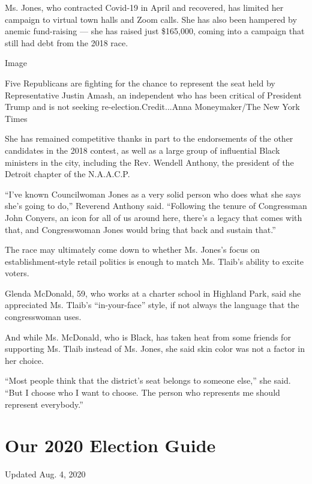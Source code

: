 Ms. Jones, who contracted Covid-19 in April and recovered, has limited
her campaign to virtual town halls and Zoom calls. She has also been
hampered by anemic fund-raising --- she has raised just \$165,000,
coming into a campaign that still had debt from the 2018 race.

Image

Five Republicans are fighting for the chance to represent the seat held
by Representative Justin Amash, an independent who has been critical of
President Trump and is not seeking re-election.Credit...Anna
Moneymaker/The New York Times

She has remained competitive thanks in part to the endorsements of the
other candidates in the 2018 contest, as well as a large group of
influential Black ministers in the city, including the Rev. Wendell
Anthony, the president of the Detroit chapter of the N.A.A.C.P.

``I've known Councilwoman Jones as a very solid person who does what she
says she's going to do,'' Reverend Anthony said. ``Following the tenure
of Congressman John Conyers, an icon for all of us around here, there's
a legacy that comes with that, and Congresswoman Jones would bring that
back and sustain that.''

The race may ultimately come down to whether Ms. Jones's focus on
establishment-style retail politics is enough to match Ms. Tlaib's
ability to excite voters.

Glenda McDonald, 59, who works at a charter school in Highland Park,
said she appreciated Ms. Tlaib's ``in-your-face'' style, if not always
the language that the congresswoman uses.

And while Ms. McDonald, who is Black, has taken heat from some friends
for supporting Ms. Tlaib instead of Ms. Jones, she said skin color was
not a factor in her choice.

``Most people think that the district's seat belongs to someone else,''
she said. ``But I choose who I want to choose. The person who represents
me should represent everybody.''

\hypertarget{our-2020-election-guide}{%
\section{Our 2020 Election Guide}\label{our-2020-election-guide}}

Updated Aug. 4, 2020

